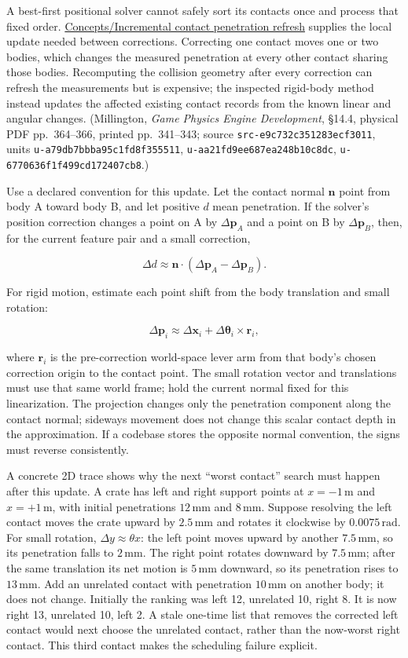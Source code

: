A best-first positional solver cannot safely sort its contacts once and process that fixed order. \hyperref[appendix-f682275acbdf]{Concepts/Incremental contact penetration refresh} supplies the local update needed between corrections. Correcting one contact moves one or two bodies, which changes the measured penetration at every other contact sharing those bodies. Recomputing the collision geometry after every correction can refresh the measurements but is expensive; the inspected rigid-body method instead updates the affected existing contact records from the known linear and angular changes. (Millington, \emph{Game Physics Engine Development}, §14.4, physical PDF pp.~364--366, printed pp.~341--343; source \texttt{src-e9c732c351283ecf3011}, units \texttt{u-a79db7bbba95c1fd8f355511}, \texttt{u-aa21fd9ee687ea248b10c8dc}, \texttt{u-6770636f1f499cd172407cb8}.)

Use a declared convention for this update. Let the contact normal \(\mathbf n\) point from body A toward body B, and let positive \(d\) mean penetration. If the solver's position correction changes a point on A by \(\Delta\mathbf p_A\) and a point on B by \(\Delta\mathbf p_B\), then, for the current feature pair and a small correction,

\[
\Delta d\approx \mathbf n\cdot(\Delta\mathbf p_A-\Delta\mathbf p_B).
\]

For rigid motion, estimate each point shift from the body translation and small rotation:

\[
\Delta\mathbf p_i\approx \Delta\mathbf x_i+\Delta\boldsymbol\theta_i\times\mathbf r_i,
\]

where \(\mathbf r_i\) is the pre-correction world-space lever arm from that body's chosen correction origin to the contact point. The small rotation vector and translations must use that same world frame; hold the current normal fixed for this linearization. The projection changes only the penetration component along the contact normal; sideways movement does not change this scalar contact depth in the approximation. If a codebase stores the opposite normal convention, the signs must reverse consistently.

A concrete 2D trace shows why the next ``worst contact'' search must happen after this update. A crate has left and right support points at \(x=-1\,\mathrm m\) and \(x=+1\,\mathrm m\), with initial penetrations \(12\,\mathrm{mm}\) and \(8\,\mathrm{mm}\). Suppose resolving the left contact moves the crate upward by \(2.5\,\mathrm{mm}\) and rotates it clockwise by \(0.0075\,\mathrm{rad}\). For small rotation, \(\Delta y\approx\theta x\): the left point moves upward by another \(7.5\,\mathrm{mm}\), so its penetration falls to \(2\,\mathrm{mm}\). The right point rotates downward by \(7.5\,\mathrm{mm}\); after the same translation its net motion is \(5\,\mathrm{mm}\) downward, so its penetration rises to \(13\,\mathrm{mm}\). Add an unrelated contact with penetration \(10\,\mathrm{mm}\) on another body; it does not change. Initially the ranking was left 12, unrelated 10, right 8. It is now right 13, unrelated 10, left 2. A stale one-time list that removes the corrected left contact would next choose the unrelated contact, rather than the now-worst right contact. This third contact makes the scheduling failure explicit.

